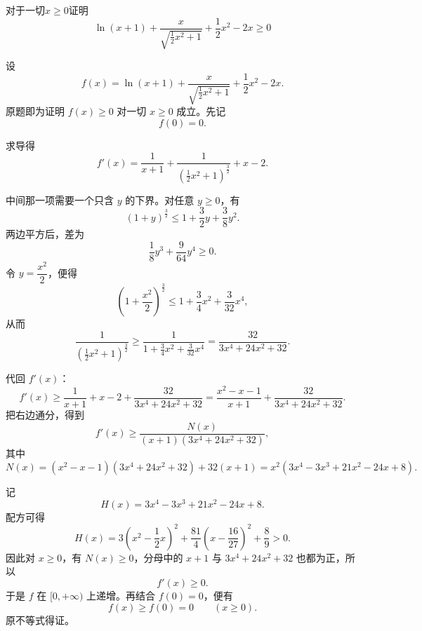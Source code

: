 \begin{example}
    对于一切$x\geq0$证明\[\ln(x+1)+\frac{x}{\sqrt{\frac{1}{2}x^2+1}}+\frac{1}{2}x^2-2x \geq 0\]
\end{example}
\begin{solution}
设
\[
f(x) = \ln(x+1) + \frac{x}{\sqrt{\frac{1}{2}x^2+1}} + \frac{1}{2}x^2 - 2x.
\]
原题即为证明 \(f(x)\ge0\) 对一切 \(x\ge0\) 成立。先记
\[
f(0)=0.
\]

求导得
\[
f'(x) = \frac{1}{x+1} + \frac{1}{\left(\frac{1}{2}x^2+1\right)^{\frac{3}{2}}} + x - 2.
\]

中间那一项需要一个只含 \(y\) 的下界。对任意 \(y\ge0\)，有
\[
(1+y)^{\frac32}\le 1+\frac32y+\frac38y^2.
\]
两边平方后，差为
\[
\frac18y^3+\frac{9}{64}y^4\ge0.
\]
令 \(y=\dfrac{x^2}{2}\)，便得
\[
\left(1+\frac{x^2}{2}\right)^{\frac32}\le 1+\frac34x^2+\frac{3}{32}x^4,
\]
从而
\[
\frac{1}{\left(\frac{1}{2}x^2+1\right)^{\frac{3}{2}}}
\ge
\frac{1}{1 + \frac{3}{4}x^2 + \frac{3}{32}x^4}
=
\frac{32}{3x^4 + 24x^2 + 32}.
\]

代回 \(f'(x)\)：
\[
f'(x)\ge \frac{1}{x+1} + x - 2 + \frac{32}{3x^4 + 24x^2 + 32}
= \frac{x^2 - x - 1}{x+1} + \frac{32}{3x^4 + 24x^2 + 32}.
\]
把右边通分，得到
\[
f'(x)\ge \frac{N(x)}{(x+1)(3x^4+24x^2+32)},
\]
其中
\[
N(x)=(x^2-x-1)(3x^4+24x^2+32)+32(x+1)
=x^2(3x^4-3x^3+21x^2-24x+8).
\]

记
\[
H(x)=3x^4-3x^3+21x^2-24x+8.
\]
配方可得
\[
H(x)=3\left(x^2-\frac12x\right)^2+\frac{81}{4}\left(x-\frac{16}{27}\right)^2+\frac89>0.
\]
因此对 \(x\ge0\)，有 \(N(x)\ge0\)，分母中的 \(x+1\) 与 \(3x^4+24x^2+32\) 也都为正，所以
\[
f'(x)\ge0.
\]
于是 \(f\) 在 \([0,+\infty)\) 上递增。再结合 \(f(0)=0\)，便有
\[
f(x)\ge f(0)=0\qquad (x\ge0).
\]
原不等式得证。
\end{solution}



